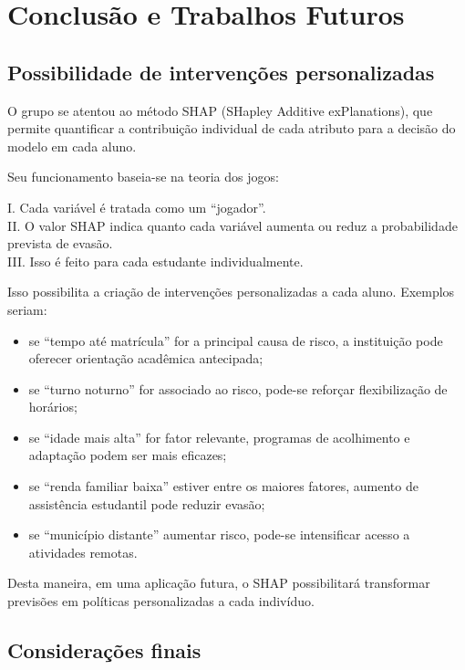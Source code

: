 \documentclass[english, spanish, brazilian]{RBIEarticle} %
\begin{document}
\section{Conclusão e Trabalhos Futuros}

\subsection{Possibilidade de intervenções personalizadas}

O grupo se atentou ao método SHAP (SHapley Additive exPlanations), que permite quantificar a contribuição individual de cada atributo para a decisão do modelo em cada aluno.

Seu funcionamento baseia-se na teoria dos jogos:

\begin{itemize}
I. Cada variável é tratada como um “jogador”. \\
II. O valor SHAP indica quanto cada variável aumenta ou reduz a probabilidade prevista de evasão.\\
III. Isso é feito para cada estudante individualmente.
\end{itemize}

Isso possibilita a criação de intervenções personalizadas a cada aluno. Exemplos seriam:

\begin{itemize}
    \item se “tempo até matrícula” for a principal causa de risco, a instituição pode oferecer orientação acadêmica antecipada;
    \item se “turno noturno” for associado ao risco, pode-se reforçar flexibilização de horários;
    \item se “idade mais alta” for fator relevante, programas de acolhimento e adaptação podem ser mais eficazes;
    \item se “renda familiar baixa” estiver entre os maiores fatores, aumento de assistência estudantil pode reduzir evasão;
    \item se “município distante” aumentar risco, pode-se intensificar acesso a atividades remotas.
\end{itemize}

Desta maneira, em uma aplicação futura, o SHAP possibilitará transformar previsões em políticas personalizadas a cada indivíduo.


\subsection{Considerações finais}
\end{document}
